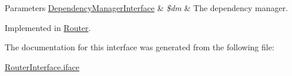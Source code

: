 \begin{DoxyParams}[1]{Parameters}
\hyperlink{interfaceDependencyManagerInterface}{Dependency\-Manager\-Interface} & {\em \$dm} & The dependency manager. \\
\hline
\end{DoxyParams}


Implemented in \hyperlink{classRouter_accbae4193c109f38cf4344a45a59f4e2}{Router}.



The documentation for this interface was generated from the following file\-:\begin{DoxyCompactItemize}
\item 
\hyperlink{RouterInterface_8iface}{Router\-Interface.\-iface}\end{DoxyCompactItemize}
